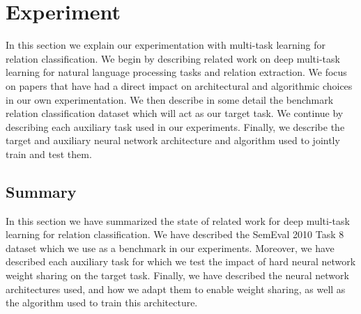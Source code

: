 \chapter{Experiment}
In this section we explain our experimentation with multi-task learning for relation classification. We begin by describing related work on deep multi-task learning for natural language processing tasks and relation extraction. We focus on papers that have had a direct impact on architectural and algorithmic choices in our own experimentation. We then describe in some detail the benchmark relation classification dataset which will act as our target task. We continue by describing each auxiliary task used in our experiments. Finally, we describe the target and auxiliary neural network architecture and algorithm used to jointly train and test them.






\section{Summary}
In this section we have summarized the state of related work for deep multi-task learning for relation classification. We have described the SemEval 2010 Task 8 dataset which we use as a benchmark in our experiments. Moreover, we have described each auxiliary task for which we test the impact of hard neural network weight sharing on the target task. Finally, we have described the neural network architectures used, and how we adapt them to enable weight sharing, as well as the algorithm used to train this architecture.